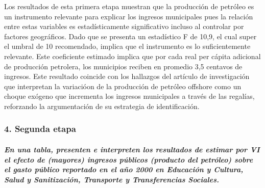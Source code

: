 \documentclass[
]{article}
\begin{document}
Los resultados de esta primera etapa muestran que la producción de
petróleo es un instrumento relevante para explicar los ingresos
municipales pues la relación entre estas variables es estadísticamente
significativo incluso al controlar por factores geográficos. Dado que se
presenta un estadístico F de 10,9, el cual super el umbral de 10
recomendado, implica que el instrumento es lo suficientemente relevante.
Este coeficiente estimado implica que por cada real per cápita adicional
de producción petrolera, los municipios reciben en promedio 3,5 centavos
de ingresos. Este resultado coincide con los hallazgos del artículo de
investigación que interpretan la variacióon de la producción de petróleo
offshore como un choque exógeno que incrementa los ingresos municipales
a través de las regalías, reforzando la argumentación de su estrategia
de identificación.

\subsubsection{4. Segunda etapa}\label{segunda-etapa}

\subparagraph{En una tabla, presenten e interpreten los resultados de
estimar por VI el efecto de (mayores) ingresos públicos (producto del
petróleo) sobre el gasto público reportado en el año 2000 en Educación y
Cultura, Salud y Sanitización, Transporte y Transferencias
Sociales.}\label{en-una-tabla-presenten-e-interpreten-los-resultados-de-estimar-por-vi-el-efecto-de-mayores-ingresos-puxfablicos-producto-del-petruxf3leo-sobre-el-gasto-puxfablico-reportado-en-el-auxf1o-2000-en-educaciuxf3n-y-cultura-salud-y-sanitizaciuxf3n-transporte-y-transferencias-sociales.}
\end{document}
